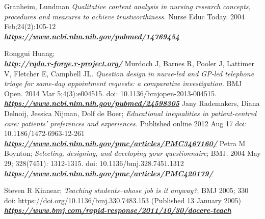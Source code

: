 \documentclass[12pt,a4paper,oneside]{article}
\begin{document}
\begin{thebibliography}{11}
Granheim, Lundman \emph{Qualitative content analysis in nursing research concepts, procedures and measures to achieve trustworthiness.} Nurse Educ Today. 2004 Feb;24(2):105-12 \\\textbf{\emph{\href{https://www.ncbi.nlm.nih.gov/pubmed/14769454}{\url{https://www.ncbi.nlm.nih.gov/pubmed/14769454}}}}


Ronggui Huang; \\\textbf{\emph{\href{http://rqda.r-forge.r-project.org/}{\url{http://rqda.r-forge.r-project.org/}}}}
Murdoch J, Barnes R, Pooler J, Lattimer V, Fletcher E, Campbell JL. \emph{Question design in nurse-led and GP-led telephone triage for same-day appointment requests: a comparative investigation.} BMJ Open. 2014 Mar 5;4(3):e004515. doi: 10.1136/bmjopen-2013-004515.\\\textbf{\emph{\href{https://www.ncbi.nlm.nih.gov/pubmed/24598305}{\url{https://www.ncbi.nlm.nih.gov/pubmed/24598305}}}}
Jany Rademakers, Diana Delnoij, Jessica Nijman, Dolf de Boer; \emph{Educational inequalities in patient-centred care: patients' preferences and experiences.} Published online 2012 Aug 17 doi: 10.1186/1472-6963-12-261\\\textbf{\emph{\href{https://www.ncbi.nlm.nih.gov/pmc/articles/PMC3467160/}{\url{https://www.ncbi.nlm.nih.gov/pmc/articles/PMC3467160/}}}}
Petra M Boynton; \emph{Selecting, designing, and developing your questionnaire}; BMJ. 2004 May 29; 328(7451): 1312-1315. doi: 10.1136/bmj.328.7451.1312\\\textbf{\emph{\href{https://www.ncbi.nlm.nih.gov/pmc/articles/PMC420179/}{\url{https://www.ncbi.nlm.nih.gov/pmc/articles/PMC420179/}}}}



Steven R Kinnear; \emph{Teaching students--whose job is it anyway?}; BMJ 2005; 330 doi: https://doi.org/10.1136/bmj.330.7483.153 (Published 13 January 2005)\\\textbf{\emph{\href{https://www.bmj.com/rapid-response/2011/10/30/docere-teach}{\url{https://www.bmj.com/rapid-response/2011/10/30/docere-teach}}}}


\end{thebibliography}
\end{document}
